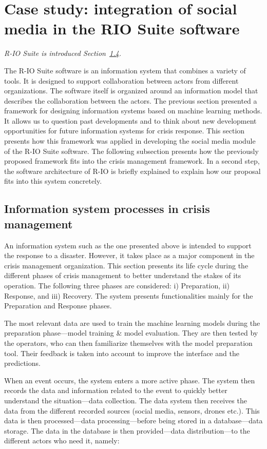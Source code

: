 \section{Case study: integration of social media in the RIO Suite software}
\textit{R-IO Suite is introduced Section~\hyperref[sec:academic-domains]{1.4}.}

The R-IO Suite software is an information system that combines a variety of tools.
It is designed to support collaboration between actors from different organizations.
The software itself is organized around an information model that describes the collaboration between the actors.
The previous section presented a framework for designing information systems based on machine learning methods.
It allows us to question past developments and to think about new development opportunities for future information systems for crisis response.
This section presents how this framework was applied in developing the social media module of the R-IO Suite software.
The following subsection presents how the previously proposed framework fits into the crisis management framework.
In a second step, the software architecture of R-IO is briefly explained to explain how our proposal fits into this system concretely.

\subsection{Information system processes in crisis management}
An information system such as the one presented above is intended to support the response to a disaster.
However, it takes place as a major component in the crisis management organization.
This section presents its life cycle during the different phases of crisis management to better understand the stakes of its operation.
The following three phases are considered: i) Preparation, ii) Response, and iii) Recovery.
The system presents functionalities mainly for the Preparation and Response phases.

The most relevant data are used to train the machine learning models during the preparation phase—model training \& model evaluation.
They are then tested by the operators, who can then familiarize themselves with the model preparation tool.
Their feedback is taken into account to improve the interface and the predictions.

When an event occurs, the system enters a more active phase.
The system then records the data and information related to the event to quickly better understand the situation—data collection.
The data system then receives the data from the different recorded sources (social media, sensors, drones etc.).
This data is then processed—data processing—before being stored in a database—data storage.
The data in the database is then provided—data distribution—to the different actors who need it, namely:

